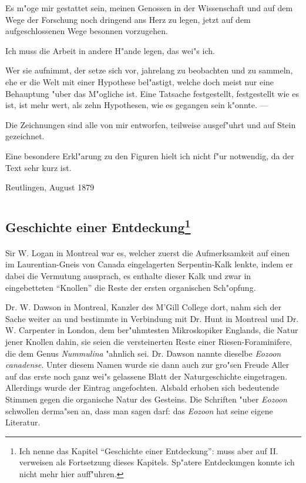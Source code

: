 \documentclass[a4paper, 11pt, oneside, german]{article}
\begin{document}
Es m"oge mir gestattet sein, meinen Genossen in der Wissenschaft und auf dem Wege der Forschung noch dringend ans Herz zu legen, jetzt auf dem aufgeschlossenen Wege besonnen vorzugehen.

Ich muss die Arbeit in andere H"ande legen, das wei"s ich.

Wer sie aufnimmt, der setze sich vor, jahrelang zu beobachten und zu sammeln, ehe er die Welt mit einer Hypothese bel"astigt, welche doch meist nur eine Behauptung "uber das M"ogliche ist. Eine Tatsache festgestellt, festgestellt wie es ist, ist mehr wert, als zehn Hypothesen, wie es gegangen sein k"onnte. ---

Die Zeichnungen sind alle von mir entworfen, teilweise ausgef"uhrt und auf Stein gezeichnet.

Eine besondere Erkl"arung zu den Figuren hielt ich nicht f"ur notwendig, da der Text sehr kurz ist.

Reutlingen, August 1879

\clearpage
\section{}
\subsection[Geschichte einer Entdeckung]{Geschichte einer Entdeckung\footnote{Ich nenne das Kapitel "`Geschichte einer Entdeckung"': muss aber auf II. verweisen als Fortsetzung dieses Kapitels. Sp"atere Entdeckungen konnte ich nicht mehr hier auff"uhren.}}
\paragraph{}
Sir W. Logan in Montreal war es, welcher zuerst die Aufmerksamkeit auf einen im Laurentian-Gneis von Canada eingelagerten Serpentin-Kalk lenkte, indem er dabei die Vermutung aussprach, es enthalte dieser Kalk und zwar in eingebetteten "`Knollen"' die Reste der ersten organischen Sch"opfung.

Dr. W. Dawson in Montreal, Kanzler des M'Gill College dort, nahm sich der Sache weiter an und bestimmte in Verbindung mit Dr. Hunt in Montreal und Dr. W. Carpenter in London, dem ber"uhmtesten Mikroskopiker Englands, die Natur jener Knollen dahin, sie seien die versteinerten Reste einer Riesen-Foraminifere, die dem Genus \emph{Nummulina} "ahnlich sei. Dr. Dawson nannte dieselbe \emph{Eozoon canadense}. Unter diesem Namen wurde sie dann auch zur gro"sen Freude Aller auf das erste noch ganz wei"s gelassene Blatt der Naturgeschichte eingetragen. Allerdings wurde der Eintrag angefochten. Alsbald erhoben sich bedeutende Stimmen gegen die organische Natur des Gesteins. Die Schriften "uber \emph{Eozoon} schwollen derma"sen an, dass man sagen darf: das \emph{Eozoon} hat seine eigene Literatur.
\end{document}

